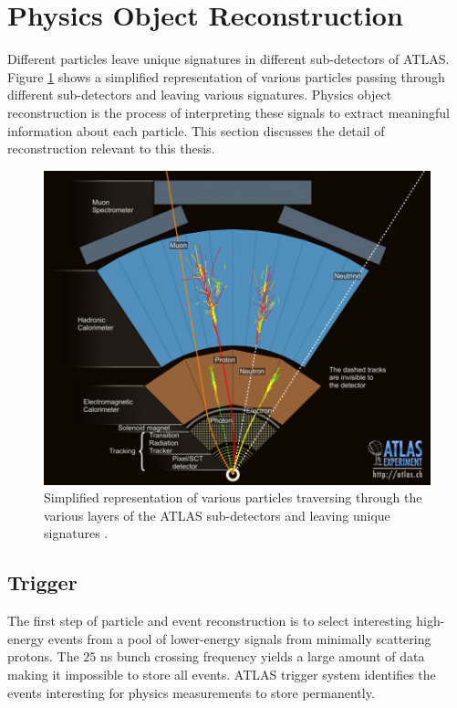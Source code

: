 \section{ Physics Object Reconstruction} 
\label{sec:ParticleReconstruction}
Different particles leave unique signatures in different sub-detectors of ATLAS. Figure \ref{fig:ATLASTransverse} shows a simplified representation of various particles passing through different sub-detectors and leaving various signatures. Physics object reconstruction is the process of interpreting these signals to extract meaningful information about each particle. This section discusses the detail of reconstruction relevant to this thesis. 

\begin{figure}[!htb]
    \centering
    \includegraphics[width=.98\linewidth]{figures/LHC/ATLAS_Transverse.jpg}
    \caption{ Simplified representation of various particles traversing through the various layers of the ATLAS sub-detectors and leaving unique signatures \cite{ATLASTransverse}.\label{fig:ATLASTransverse}}
\end{figure}

\subsection{Trigger}
\label{subsec:TriggerATLAS}
The first step of particle and event reconstruction is to select interesting high-energy events from a pool of lower-energy signals from minimally scattering protons. The $25$ ns bunch crossing frequency yields a large amount of data making it impossible to store all events. ATLAS trigger system identifies the events interesting for physics measurements to store permanently. 

